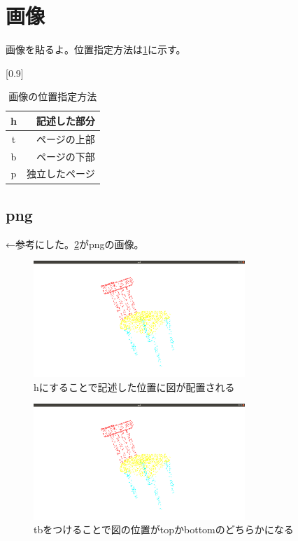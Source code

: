 \documentclass[a4j,uplatex,titlepage]{jsarticle}
\begin{document}
\section{画像}
画像を貼るよ。位置指定方法は\ref{画像の位置指定方法}に示す。
\begin{table}[h]
    \begin{center}
      \caption{{画像の位置指定方法}\label{画像の位置指定方法}}
      \scalebox{0.7}[0.9]{
        \begin{tabular}{|c|r|} \hline
          h & 記述した部分 \\ \hline
          t & ページの上部 \\ \hline
          b & ページの下部 \\ \hline
          p & 独立したページ \\ \hline
        \end{tabular}
      }
    \end{center}
  \end{table}

\subsection{png}
\cite{png}←参考にした。\ref{fig:one}がpngの画像。
\begin{figure}[h]
    \begin{center}
    \includegraphics[width=8cm]{figure/pcl.png}
    \end{center}
    \caption{hにすることで記述した位置に図が配置される}
    \label{f1}
\end{figure}

\begin{figure}[tb]
    \begin{center}
    \includegraphics[width=8cm]{figure/pcl.png}
    \end{center}
    \caption{tbをつけることで図の位置がtopかbottomのどちらかになる}
    \label{fig:one}
\end{figure}
\end{document}
